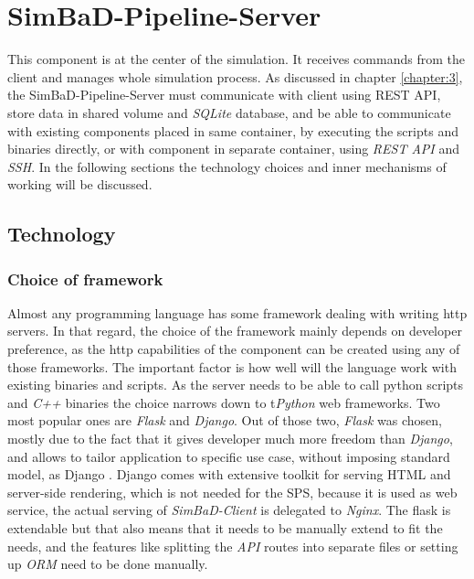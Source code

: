 \section{SimBaD-Pipeline-Server}
This component is at the center of the simulation. It receives commands from the client and manages whole simulation process.
As discussed in chapter \ref{chapter:3}, the SimBaD-Pipeline-Server must communicate with client using REST API, store data in shared volume and \textit{SQLite} database, and be able to communicate with existing components placed in same container, by executing the scripts and binaries directly, or with component in separate container, using \textit{REST API} and \textit{SSH}. In the following sections the technology choices and inner mechanisms of working will be discussed.
\subsection{Technology}
\subsubsection{Choice of framework}
Almost any programming language has some framework dealing with writing http servers. In that regard, the choice of the framework mainly depends on developer preference, as the http capabilities of the component can be created using any of those frameworks. The important factor is how well will the language work with existing binaries and scripts. As the server needs to be able to call python scripts and \textit{C++} binaries the choice narrows down to t\textit{Python} web frameworks. Two most popular ones are \textit{Flask} and \textit{Django}. Out of those two, \textit{Flask} was chosen, mostly due to the fact that it gives developer much more freedom than \textit{Django}, and allows to tailor application to specific use case, without imposing standard model, as Django \cite{FlaskDjango}. Django comes with extensive toolkit for serving HTML and server-side rendering, which is not needed for the SPS, because it is used as web service, the actual serving of \textit{SimBaD-Client} is delegated to \textit{Nginx}.
The flask is extendable but that also means that it needs to be manually extend to fit the needs, and the features like splitting the \textit{API} routes into separate files or setting up \textit{ORM} need to be done manually.
